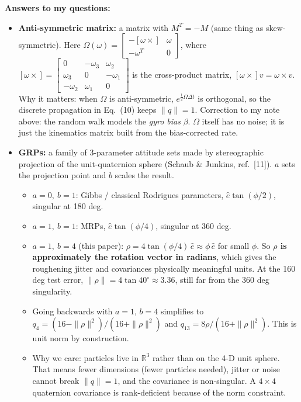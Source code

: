 \documentclass[11pt]{article}
\begin{document}
\textbf{Answers to my questions:}
\begin{itemize}[noitemsep]
    \item \textbf{Anti-symmetric matrix:} a matrix with $M^T = -M$ (same thing as skew-symmetric). Here
    $\Omega(\omega) = \begin{bmatrix} -[\omega\times] & \omega \\ -\omega^T & 0 \end{bmatrix}$, where $[\omega\times] = \begin{bmatrix} 0 & -\omega_3 & \omega_2 \\ \omega_3 & 0 & -\omega_1 \\ -\omega_2 & \omega_1 & 0 \end{bmatrix}$ is the cross-product matrix, $[\omega\times]v = \omega\times v$.
    Why it matters: when $\Omega$ is anti-symmetric, $e^{\frac{1}{2}\Omega\Delta t}$ is orthogonal, so the discrete propagation in Eq.\ (10) keeps $\|q\| = 1$.
    Correction to my note above: the random walk models the \textit{gyro bias} $\beta$. $\Omega$ itself has no noise; it is just the kinematics matrix built from the bias-corrected rate.
    \item \textbf{GRPs:} a family of 3-parameter attitude sets made by stereographic projection of the unit-quaternion sphere (Schaub \& Junkins, ref.\ [11]). $a$ sets the projection point and $b$ scales the result.
    \begin{itemize}[noitemsep]
        \item $a=0,\ b=1$: Gibbs / classical Rodrigues parameters, $\hat{e}\tan(\phi/2)$, singular at 180 deg.
        \item $a=1,\ b=1$: MRPs, $\hat{e}\tan(\phi/4)$, singular at 360 deg.
        \item $a=1,\ b=4$ (this paper): $\rho = 4\tan(\phi/4)\,\hat{e} \approx \phi\,\hat{e}$ for small $\phi$. So \textbf{$\rho$ is approximately the rotation vector in radians}, which gives the roughening jitter and covariances physically meaningful units. At the 160 deg test error, $\|\rho\| = 4\tan 40^\circ \approx 3.36$, still far from the 360 deg singularity.
        \item Going backwards with $a=1$, $b=4$ simplifies to $q_4 = (16 - \|\rho\|^2)/(16 + \|\rho\|^2)$ and $q_{13} = 8\rho/(16 + \|\rho\|^2)$. This is unit norm by construction.
        \item Why we care: particles live in $\mathbb{R}^3$ rather than on the 4-D unit sphere. That means fewer dimensions (fewer particles needed), jitter or noise cannot break $\|q\| = 1$, and the covariance is non-singular. A $4\times4$ quaternion covariance is rank-deficient because of the norm constraint.

\end{itemize}
\end{itemize}
\end{document}
